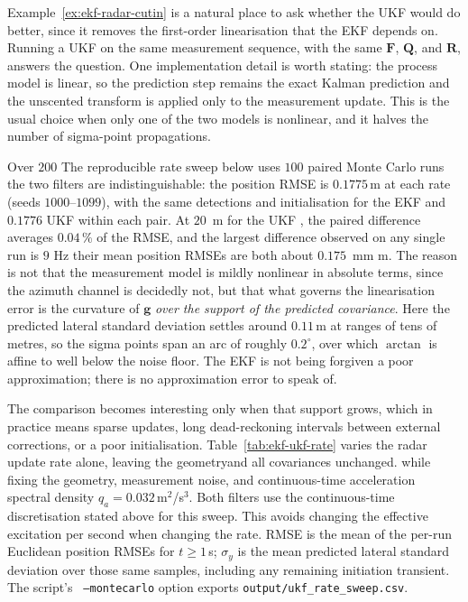 \documentclass[graybox,envcountchap]{style/SNmono}
\newcommand{\repopath}[1]{\texttt{#1}}
\providecommand{\DIFadd}[1]{{\protect\color{blue} #1}} %
\providecommand{\DIFdel}[1]{{\protect\color{red} #1}} %
\providecommand{\DIFaddbegin}{} %
\providecommand{\DIFaddend}{} %
\providecommand{\DIFdelbegin}{} %
\providecommand{\DIFdelend}{} %
\begin{document}
\begin{example}
\label{ex:ukf-radar-cutin}
Example~\ref{ex:ekf-radar-cutin} is a natural place to ask whether the UKF
would do better, since it removes the first-order linearisation that the EKF
depends on. Running a UKF on the same measurement sequence, with the same
$\mathbf{F}$, $\mathbf{Q}$, and $\mathbf{R}$, answers the question. One
implementation detail is worth stating: the process model is linear, so the
prediction step remains the exact Kalman prediction and the unscented transform
is applied only to the measurement update. This is the usual choice when only
one of the two models is nonlinear, and it halves the number of sigma-point
propagations.

\DIFdelbegin \DIFdel{Over $200$ }\DIFdelend \DIFaddbegin \DIFadd{The reproducible rate sweep below uses $100$ paired }\DIFaddend Monte Carlo runs \DIFdelbegin \DIFdel{the two filters are indistinguishable: the position
RMSE is $0.1775$\,m }\DIFdelend \DIFaddbegin \DIFadd{at each rate (seeds $1000$--$1099$), with the same detections and initialisation }\DIFaddend for the EKF and \DIFdelbegin \DIFdel{$0.1776$}\DIFdelend \DIFaddbegin \DIFadd{UKF within each pair. At $20$}\DIFaddend \,\DIFdelbegin \DIFdel{m for the UKF , the paired
difference averages $0.04\,\%$ of the RMSE, and the largest difference observed
on any single run is $9$}\DIFdelend \DIFaddbegin \DIFadd{Hz their mean position RMSEs are both about $0.175$}\DIFaddend \,\DIFdelbegin \DIFdel{mm}\DIFdelend \DIFaddbegin \DIFadd{m}\DIFaddend . The reason is not that the measurement model is
mildly nonlinear in absolute terms, since the azimuth channel is decidedly not,
but that what governs the linearisation error is the curvature of
$\mathbf{g}$ \emph{over the support of the predicted covariance}. Here the
predicted lateral standard deviation settles around $0.11$\,m at ranges of tens
of metres, so the sigma points span an arc of roughly $0.2^{\circ}$, over which
$\arctan$ is affine to well below the noise floor. The EKF is not being
forgiven a poor approximation; there is no approximation error to speak of.

The comparison becomes interesting only when that support grows, which in
practice means sparse updates, long dead-reckoning intervals between external
corrections, or a poor initialisation. Table~\ref{tab:ekf-ukf-rate} varies the
radar update rate \DIFdelbegin \DIFdel{alone, leaving the geometryand all covariances unchanged. }\DIFdelend \DIFaddbegin \DIFadd{while fixing the geometry, measurement noise, and continuous-time acceleration spectral density $q_a=0.032$\,m$^2$/s$^3$. Both filters use the continuous-time discretisation stated above for this sweep. This avoids changing the effective excitation per second when changing the rate. RMSE is the mean of the per-run Euclidean position RMSEs for $t\ge1$\,s; $\sigma_y$ is the mean predicted lateral standard deviation over those same samples, including any remaining initiation transient. The script's }\texttt{\DIFadd{--montecarlo}} \DIFadd{option exports \repopath{output/ukf\_rate\_sweep.csv}.
}\DIFaddend 


\end{example}
\end{document}
